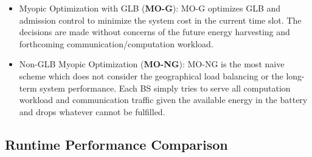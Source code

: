 \documentclass[12pt, draftclsnofoot, letterpaper, onecolumn]{IEEEtran}
\begin{document}
{\begin{itemize}
	\item Myopic Optimization with GLB (\textbf{MO-G}): MO-G optimizes GLB and admission control to minimize the system cost in the current time slot. The decisions are made without concerns of the future energy harvesting and forthcoming communication/computation workload.
	
	\item Non-GLB Myopic Optimization (\textbf{MO-NG}): MO-NG is the most naive scheme which does not consider the geographical load balancing or the long-term system performance. Each BS simply tries to serve all computation workload and communication traffic given the available energy in the battery and drops whatever cannot be fulfilled.
	
\end{itemize}


\subsection{Runtime Performance Comparison}

}
\end{document}
